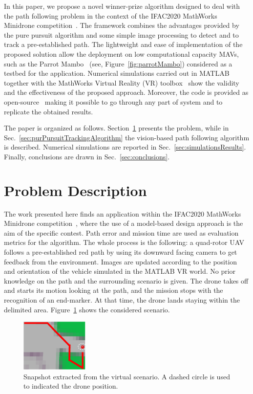 \documentclass[a4paper,twocolumn,10pt]{article}
\begin{document}
    In this paper, we propose a novel winner-prize algorithm designed to deal with the path following problem in the context of the IFAC2020 MathWorks Minidrone 
    competition~\cite{4_Mathworks_url}. The framework combines the advantages provided by the pure pursuit algorithm and some simple image processing to detect and to track a pre-established path. The lightweight and ease of implementation of the proposed solution allow the deployment on low computational 
    capacity MAVs, such as the Parrot Mambo~\cite{15_Mathworks_url} (see, Figure~\ref{fig:parrotMambo}) considered as a testbed for the application. Numerical simulations 
    carried out in MATLAB together with the MathWorks Virtual Reality (VR) toolbox~\cite{SilanoMATFly} show the validity and the effectiveness of the proposed approach. Moreover, the code is provided as 
    open-source~\cite{GitHubCode} making it possible to go through any part of system and to replicate the obtained results. 

    The paper is organized as follows. Section~\ref{sec:problemDescription} presents the problem, while in Sec.~\ref{sec:purPursuitTrackingAlgorithm} the vision-based path following algorithm is 
    described. Numerical simulations are reported in Sec.~\ref{sec:simulationsResults}. Finally, conclusions are drawn in Sec.~\ref{sec:conclusions}. 

    \section{Problem Description}
    \label{sec:problemDescription}

    The work presented here finds an application within the IFAC2020 MathWorks Minidrone competition~\cite{4_Mathworks_url}, where the use of a model-based design approach is the aim of the specific contest. Path error and mission time are used as evaluation metrics for the algorithm. The whole process is the following: a quad-rotor UAV follows a pre-established red path by using its downward facing camera to get feedback from the environment. Images are updated according to the position and orientation of the vehicle simulated in the MATLAB VR world. No prior knowledge on the path and the surrounding scenario is given. The drone takes off and starts its  motion looking at the path, and the mission stops with the recognition of an end-marker. At that time, the drone lands staying within the delimited area. 
    Figure~\ref{fig:arena} shows the considered scenario. 

    \begin{figure}
        \centering
        \includegraphics[width=0.3\textwidth]{pics/fig2_track.png}
        \caption{Snapshot extracted from the virtual scenario. A dashed circle is used to indicated the drone position.}
        \label{fig:arena}
    \end{figure}
\end{document}

